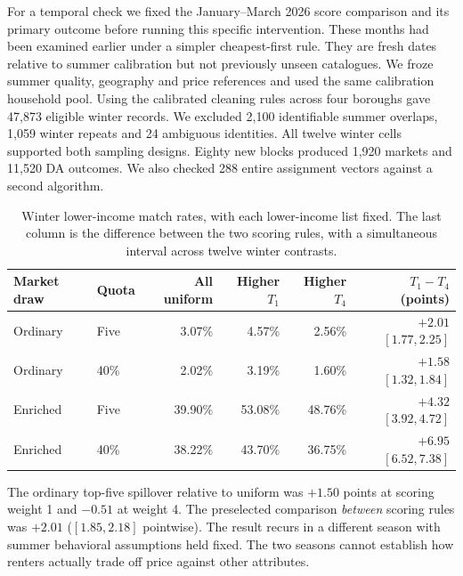 For a temporal check we fixed the January--March 2026 score comparison and its primary outcome before running this specific intervention. These months had been examined earlier under a simpler cheapest-first rule. They are fresh dates relative to summer calibration but not previously unseen catalogues. We froze summer quality, geography and price references and used the same calibration household pool. Using the calibrated cleaning rules across four boroughs gave 47,873 eligible winter records. We excluded 2,100 identifiable summer overlaps, 1,059 winter repeats and 24 ambiguous identities. All twelve winter cells supported both sampling designs. Eighty new blocks produced 1,920 markets and 11,520 DA outcomes. We also checked 288 entire assignment vectors against a second algorithm.

\begin{table}[t]\centering
\caption{Winter lower-income match rates, with each lower-income list fixed. The last column is the difference between the two scoring rules, with a simultaneous interval across twelve winter contrasts.}
\label{tab:winter}
\begin{tabular}{@{}llrrrr@{}}\toprule
Market draw & Quota & All uniform & Higher $T_1$ & Higher $T_4$ & $T_1-T_4$ (points)\\\midrule
Ordinary & Five & 3.07\% & 4.57\% & 2.56\% & $+2.01$ $[1.77,2.25]$\\
Ordinary & 40\% & 2.02\% & 3.19\% & 1.60\% & $+1.58$ $[1.32,1.84]$\\
Enriched & Five & 39.90\% & 53.08\% & 48.76\% & $+4.32$ $[3.92,4.72]$\\
Enriched & 40\% & 38.22\% & 43.70\% & 36.75\% & $+6.95$ $[6.52,7.38]$\\\bottomrule
\end{tabular}
\end{table}
The ordinary top-five spillover relative to uniform was $+1.50$ points at scoring weight 1 and $-0.51$ at weight 4. The preselected comparison \emph{between} scoring rules was $+2.01$ ($[1.85,2.18]$ pointwise). The result recurs in a different season with summer behavioral assumptions held fixed. The two seasons cannot establish how renters actually trade off price against other attributes.
